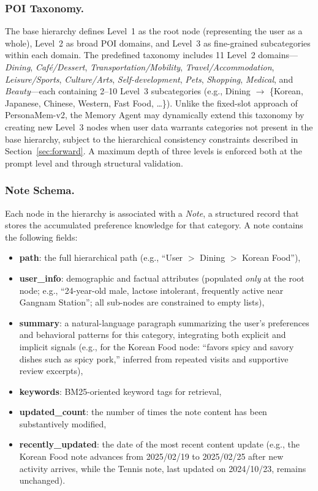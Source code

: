 \documentclass[sigconf,review,anonymous]{acmart}
\begin{document}
\subsubsection{POI Taxonomy.}
The base hierarchy defines Level~1 as the root node (representing the user as a whole), Level~2 as broad POI domains, and Level~3 as fine-grained subcategories within each domain. The predefined taxonomy includes 11 Level~2 domains---\textit{Dining}, \textit{Caf\'{e}/Dessert}, \textit{Transportation/Mobility}, \textit{Travel/Accommodation}, \textit{Leisure/Sports}, \textit{Culture/Arts}, \textit{Self-development}, \textit{Pets}, \textit{Shopping}, \textit{Medical}, and \textit{Beauty}---each containing 2--10 Level~3 subcategories (e.g., Dining $\rightarrow$ \{Korean, Japanese, Chinese, Western, Fast Food, \ldots\}). Unlike the fixed-slot approach of PersonaMem-v2, the Memory Agent may dynamically extend this taxonomy by creating new Level~3 nodes when user data warrants categories not present in the base hierarchy, subject to the hierarchical consistency constraints described in Section~\ref{sec:forward}. A maximum depth of three levels is enforced both at the prompt level and through structural validation.

\subsubsection{Note Schema.}
Each node in the hierarchy is associated with a \textit{Note}, a structured record that stores the accumulated preference knowledge for that category. A note contains the following fields:

\begin{itemize}
    \item \textbf{path}: the full hierarchical path (e.g., ``User $>$ Dining $>$ Korean Food''),
    \item \textbf{user\_info}: demographic and factual attributes (populated \textit{only} at the root node; e.g., ``24-year-old male, lactose intolerant, frequently active near Gangnam Station''; all sub-nodes are constrained to empty lists),
    \item \textbf{summary}: a natural-language paragraph summarizing the user's preferences and behavioral patterns for this category, integrating both explicit and implicit signals (e.g., for the Korean Food node: ``favors spicy and savory dishes such as spicy pork,'' inferred from repeated visits and supportive review excerpts),
    \item \textbf{keywords}: BM25-oriented keyword tags for retrieval,
    \item \textbf{updated\_count}: the number of times the note content has been substantively modified,
    \item \textbf{recently\_updated}: the date of the most recent content update (e.g., the Korean Food note advances from 2025/02/19 to 2025/02/25 after new activity arrives, while the Tennis note, last updated on 2024/10/23, remains unchanged).
\end{itemize}
\end{document}
